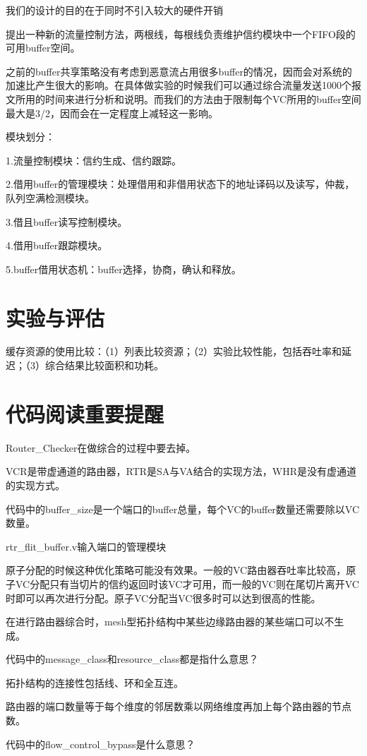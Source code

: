 \documentclass[10pt,journal]{IEEEtran}
\begin{document}
我们的设计的目的在于同时不引入较大的硬件开销

提出一种新的流量控制方法，两根线，每根线负责维护信约模块中一个FIFO段的可用buffer空间。

之前的buffer共享策略没有考虑到恶意流占用很多buffer的情况，因而会对系统的加速比产生很大的影响。在具体做实验的时候我们可以通过综合流量发送1000个报文所用的时间来进行分析和说明。而我们的方法由于限制每个VC所用的buffer空间最大是3/2，因而会在一定程度上减轻这一影响。

模块划分：

1.流量控制模块：信约生成、信约跟踪。

2.借用buffer的管理模块：处理借用和非借用状态下的地址译码以及读写，仲裁，队列空满检测模块。

3.借且buffer读写控制模块。

4.借用buffer跟踪模块。

5.buffer借用状态机：buffer选择，协商，确认和释放。

\section{实验与评估}
缓存资源的使用比较：（1）列表比较资源；（2）实验比较性能，包括吞吐率和延迟；（3）综合结果比较面积和功耗。

\section{代码阅读重要提醒}
Router\_Checker在做综合的过程中要去掉。

VCR是带虚通道的路由器，RTR是SA与VA结合的实现方法，WHR是没有虚通道的实现方式。

代码中的buffer\_size是一个端口的buffer总量，每个VC的buffer数量还需要除以VC数量。

rtr\_flit\_buffer.v输入端口的管理模块

原子分配的时候这种优化策略可能没有效果。一般的VC路由器吞吐率比较高，原子VC分配只有当切片的信约返回时该VC才可用，而一般的VC则在尾切片离开VC时即可以再次进行分配。原子VC分配当VC很多时可以达到很高的性能。

在进行路由器综合时，mesh型拓扑结构中某些边缘路由器的某些端口可以不生成。

代码中的message\_class和resource\_class都是指什么意思？

拓扑结构的连接性包括线、环和全互连。

路由器的端口数量等于每个维度的邻居数乘以网络维度再加上每个路由器的节点数。

代码中的flow\_control\_bypass是什么意思？
\end{document}
